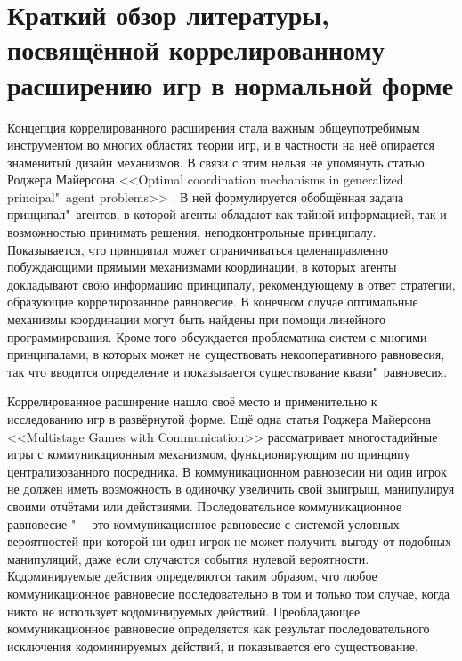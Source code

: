 \chapter{Краткий обзор литературы, посвящённой коррелированному расширению игр в нормальной форме}\label{app:A}

Концепция коррелированного расширения стала важным общеупотребимым инструментом во многих областях теории игр, и в частности на неё опирается знаменитый дизайн механизмов. В связи с этим нельзя не упомянуть статью Роджера Майерсона <<Optimal coordination mechanisms in generalized principal"~agent problems>> \cite{Myerson82}. В ней формулируется обобщённая задача принципал"~агентов, в которой агенты обладают как тайной информацией, так и возможностью принимать решения, неподконтрольные принципалу. Показывается, что принципал может ограничиваться целенаправленно побуждающими прямыми механизмами координации, в которых агенты докладывают свою информацию принципалу, рекомендующему в ответ стратегии, образующие коррелированное равновесие. В конечном случае оптимальные механизмы координации могут быть найдены при помощи линейного программирования. Кроме того обсуждается проблематика систем с многими принципалами, в которых может не существовать некооперативного равновесия, так что вводится определение и показывается существование квази"~равновесия.

Коррелированное расширение нашло своё место и применительно к исследованию игр в развёрнутой форме. Ещё одна статья Роджера Майерсона <<Multistage Games with Communication>> \cite{Myerson86} рассматривает многостадийные игры с коммуникационным механизмом, функционирующим по принципу централизованного посредника. В коммуникационном равновесии ни один игрок не должен иметь возможность в одиночку увеличить свой выигрыш, манипулируя своими отчётами или действиями. Последовательное коммуникационное равновесие "--- это коммуникационное равновесие с системой условных вероятностей при которой ни один игрок не может получить выгоду от подобных манипуляций, даже если случаются события нулевой вероятности. Кодоминируемые действия определяются таким образом, что любое коммуникационное равновесие последовательно в том и только том случае, когда никто не использует кодоминируемых действий. Преобладающее коммуникационное равновесие определяется как результат последовательного исключения кодоминируемых действий, и показывается его существование.

